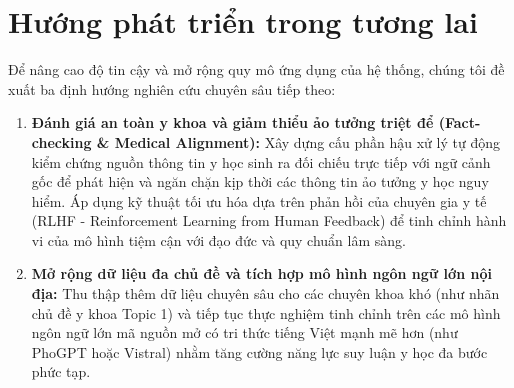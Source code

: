 \section{Hướng phát triển trong tương lai}
Để nâng cao độ tin cậy và mở rộng quy mô ứng dụng của hệ thống, chúng tôi đề xuất ba định hướng nghiên cứu chuyên sâu tiếp theo:
\begin{enumerate}
    \item \textbf{Đánh giá an toàn y khoa và giảm thiểu ảo tưởng triệt để (Fact-checking \& Medical Alignment):} Xây dựng cấu phần hậu xử lý tự động kiểm chứng nguồn thông tin y học sinh ra đối chiếu trực tiếp với ngữ cảnh gốc để phát hiện và ngăn chặn kịp thời các thông tin ảo tưởng y học nguy hiểm. Áp dụng kỹ thuật tối ưu hóa dựa trên phản hồi của chuyên gia y tế (RLHF - Reinforcement Learning from Human Feedback) để tinh chỉnh hành vi của mô hình tiệm cận với đạo đức và quy chuẩn lâm sàng.
    \item \textbf{Mở rộng dữ liệu đa chủ đề và tích hợp mô hình ngôn ngữ lớn nội địa:} Thu thập thêm dữ liệu chuyên sâu cho các chuyên khoa khó (như nhãn chủ đề y khoa Topic 1) và tiếp tục thực nghiệm tinh chỉnh trên các mô hình ngôn ngữ lớn mã nguồn mở có tri thức tiếng Việt mạnh mẽ hơn (như PhoGPT hoặc Vistral) nhằm tăng cường năng lực suy luận y học đa bước phức tạp.
\end{enumerate}